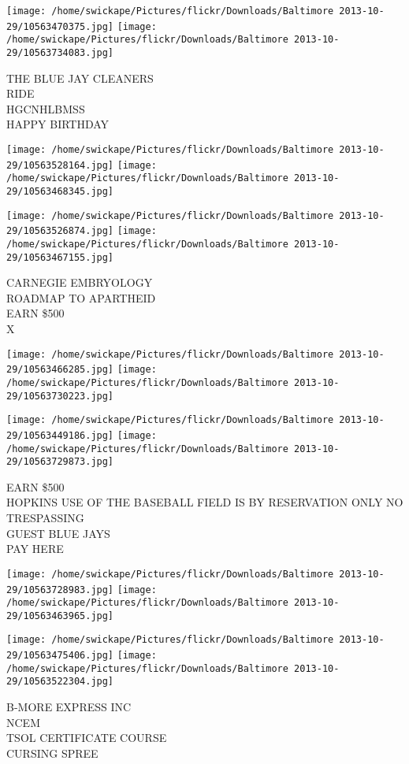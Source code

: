 \documentclass[10pt,letterpaper]{article}
\begin{document}
\texttt{[image: /home/swickape/Pictures/flickr/Downloads/Baltimore 2013-10-29/10563470375.jpg]}
\texttt{[image: /home/swickape/Pictures/flickr/Downloads/Baltimore 2013-10-29/10563734083.jpg]}

THE BLUE JAY CLEANERS\\
RIDE\\
HGCNHLBMSS\\
HAPPY BIRTHDAY
\pagebreak

\texttt{[image: /home/swickape/Pictures/flickr/Downloads/Baltimore 2013-10-29/10563528164.jpg]}
\texttt{[image: /home/swickape/Pictures/flickr/Downloads/Baltimore 2013-10-29/10563468345.jpg]}

\texttt{[image: /home/swickape/Pictures/flickr/Downloads/Baltimore 2013-10-29/10563526874.jpg]}
\texttt{[image: /home/swickape/Pictures/flickr/Downloads/Baltimore 2013-10-29/10563467155.jpg]}

CARNEGIE EMBRYOLOGY\\
ROADMAP TO APARTHEID\\
EARN \$500\\
X
\pagebreak

\texttt{[image: /home/swickape/Pictures/flickr/Downloads/Baltimore 2013-10-29/10563466285.jpg]}
\texttt{[image: /home/swickape/Pictures/flickr/Downloads/Baltimore 2013-10-29/10563730223.jpg]}

\texttt{[image: /home/swickape/Pictures/flickr/Downloads/Baltimore 2013-10-29/10563449186.jpg]}
\texttt{[image: /home/swickape/Pictures/flickr/Downloads/Baltimore 2013-10-29/10563729873.jpg]}

EARN \$500\\
HOPKINS USE OF THE BASEBALL FIELD IS BY RESERVATION ONLY NO TRESPASSING\\
GUEST BLUE JAYS\\
PAY HERE
\pagebreak

\texttt{[image: /home/swickape/Pictures/flickr/Downloads/Baltimore 2013-10-29/10563728983.jpg]}
\texttt{[image: /home/swickape/Pictures/flickr/Downloads/Baltimore 2013-10-29/10563463965.jpg]}

\texttt{[image: /home/swickape/Pictures/flickr/Downloads/Baltimore 2013-10-29/10563475406.jpg]}
\texttt{[image: /home/swickape/Pictures/flickr/Downloads/Baltimore 2013-10-29/10563522304.jpg]}

B{-}MORE EXPRESS INC\\
NCEM\\
TSOL CERTIFICATE COURSE\\
CURSING SPREE
\pagebreak
\end{document}
